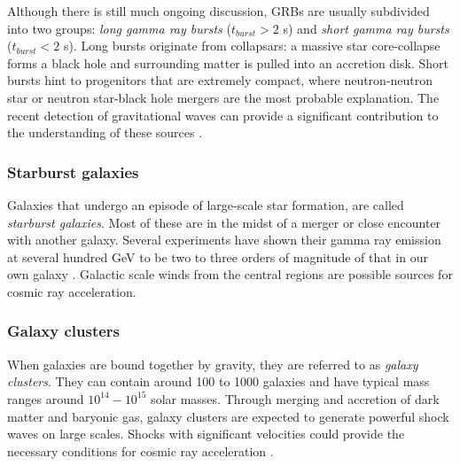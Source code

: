 \noindent Although there is still much ongoing discussion, GRBs are usually subdivided into two groups: \textit{long gamma ray bursts} ($t_{burst} > 2$ s) and \textit{short gamma ray bursts} ($t_{burst} < 2$ s). Long bursts originate from collapsars: a massive star core-collapse forms a black hole and surrounding matter is pulled into an accretion disk. Short bursts hint to progenitors that are extremely compact, where neutron-neutron star or neutron star-black hole mergers are the most probable explanation. The recent detection of gravitational waves can provide a significant contribution to the understanding of these sources \cite{TheLIGOScientific:2017qsa,Abbott:2017oio,Abbott:2017gyy,Abbott:2017vtc,Abbott:2016nmj}.


\subsubsection{Starburst galaxies}
Galaxies that undergo an episode of large-scale star formation, are called \textit{starburst galaxies}. Most of these are in the midst of a merger or close encounter with another galaxy. Several experiments have shown their gamma ray emission at several hundred GeV to be two to three orders of magnitude of that in our own galaxy \cite{Acero:2009nb,Karlsson:2009hd}. Galactic scale winds from the central regions are possible sources for cosmic ray acceleration.

\subsubsection{Galaxy clusters}
When galaxies are bound together by gravity, they are referred to as \textit{galaxy clusters}. They can contain around 100 to 1000 galaxies and have typical mass ranges around $10^{14}-10^{15}$ solar masses. Through merging and accretion of dark matter and baryonic gas, galaxy clusters are expected to generate powerful shock waves on large scales. Shocks with significant velocities could provide the necessary conditions for cosmic ray acceleration \cite{1538-4357-689-2-L105}.

